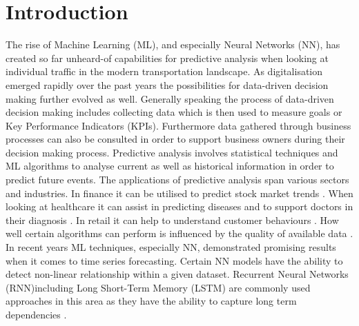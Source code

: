 %
%
% 
% 
% 

\chapter{Introduction}
\label{chap:introduction}
The rise of Machine Learning (ML), and especially Neural Networks (NN), has created so far unheard-of capabilities for predictive analysis when looking at individual traffic in the modern transportation landscape. As digitalisation emerged rapidly over the past years the possibilities for data-driven decision making further evolved as well. Generally speaking the process of data-driven decision making includes collecting data which is then used to measure goals or Key Performance Indicators (KPIs). Furthermore data gathered through business processes can also be consulted in order to support business owners during their decision making process.
\newline
\newline 
Predictive analysis involves statistical techniques and ML algorithms to analyse current as well as historical information in order to predict future events. The applications of predictive analysis span various sectors and industries. In finance it can be utilised to predict stock market trends \cite{stock_market}. When looking at healthcare it can assist in predicting diseases and to support doctors in their diagnosis \cite{health_care}. In retail it can help to understand customer behaviours \cite{retail}. How well certain algorithms can perform is influenced by the quality of available data \cite{data_qual}. In recent years ML techniques, especially NN, demonstrated promising results when it comes to time series forecasting. Certain NN models have the ability to detect non-linear relationship within a given dataset. Recurrent Neural Networks (RNN)including Long Short-Term Memory (LSTM) are commonly used approaches in this area as they have the ability to capture long term dependencies \cite{intro_ml_1}.
\newline
\newline
